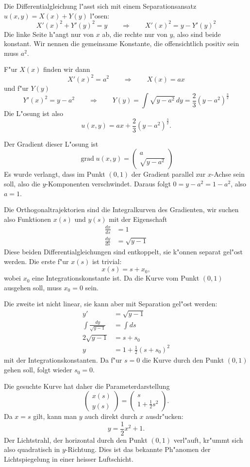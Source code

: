 \begin{loesung}
Die Differentialgleichung  l"asst sich mit einem Separationsansatz
$u(x,y)=X(x)+Y(y)$
l"osen:
\[
X'(x)^2+Y'(y)^2=y
\qquad
\Rightarrow
\qquad
X'(x)^2=y-Y'(y)^2
\]
Die linke Seite h"angt nur von $x$ ab, die rechte nur von $y$, also
sind beide konstant.
Wir nennen die gemeinsame Konstante, die offensichtlich positiv sein
muss $a^2$.

F"ur $X(x)$ finden wir dann
\[
X'(x)^2=a^2
\qquad\Rightarrow\qquad
X(x)=ax
\]
und f"ur $Y(y)$
\[
Y'(x)^2=y-a^2
\qquad\Rightarrow\qquad
Y(y)=\int \sqrt{y-a^2}\,dy=\frac23(y-a^2)^{\frac32}
\]
Die L"osung ist also
\[
u(x,y)=ax + \frac23(y-a^2)^{\frac32}.
\]

Der Gradient dieser L"osung ist
\[
\operatorname{grad}u(x,y)=\begin{pmatrix}a\\\sqrt{y-a^2}\end{pmatrix}
\]
Es wurde verlangt, dass im Punkt $(0,1)$ der Gradient parallel zur
$x$-Achse sein soll, also die $y$-Komponenten verschwindet. Daraus
folgt $0=y-a^2=1-a^2$, also $a=1$.

Die Orthogonaltrajektorien sind die Integralkurven des Gradienten,
wir suchen also Funktionen $x(s)$ und $y(s)$ mit der Eigenschaft
\begin{align*}
\frac{dx}{ds}&=1\\
\frac{dy}{ds}&=\sqrt{y-1}
\end{align*}
Diese beiden Differentialgleichungen sind entkoppelt, sie k"onnen
separat gel"ost werden. Die erste f"ur $x(s)$ ist trivial:
\[
x(s)=s + x_0,
\]
wobei $x_0$ eine Integrationskonstante ist.
Da die Kurve vom Punkt $(0,1)$ ausgehen soll, muss $x_0=0$ sein.

Die zweite ist nicht linear, sie kann aber mit Separation gel"ost
werden:
\begin{align*}
y'&=\sqrt{y-1}
\\
\int \frac{dy}{\sqrt{y-1}}&=\int ds
\\
2\sqrt{y-1}&=s+s_0
\\
y&=1+\frac12(s+s_0)^2
\end{align*}
mit der Integrationskonstanten.
Da f"ur $s=0$ die Kurve durch den Punkt $(0,1)$ gehen soll, folgt
wieder $s_0=0$.

Die gesuchte Kurve hat daher die Parameterdarstellung
\[
\begin{pmatrix}
x(s)\\y(s)
\end{pmatrix}
=
\begin{pmatrix}
s\\
1+\frac12s^2
\end{pmatrix}.
\]
Da $x=s$ gilt, kann man $y$ auch direkt durch $x$ ausdr"ucken:
\[
y=\frac12x^2+1.
\]
Der Lichtstrahl, der horizontal durch den Punkt $(0,1)$ verl"auft,
kr"ummt sich also quadratisch in $y$-Richtung.
Dies ist das bekannte Ph"anomen der Lichtspiegelung in einer
heisser Luftschicht.
\end{loesung}

